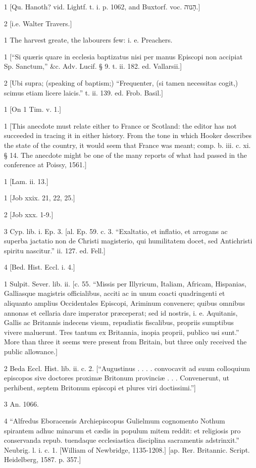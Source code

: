 1
[Qu. Hanoth? vid. Lightf. t. i. p. 1062, and Buxtorf. voc. הָנוה.]

2
[i.e. Walter Travers.]

1
The harvest greate, the labourers few: i. e. Preachers.

1
[“Si quæris quare in ecclesia baptizatus nisi per manus Episcopi non accipiat Sp. Sanctum,” &c. Adv. Lucif. § 9. t. ii. 182. ed. Vallarsii.]

2
[Ubi supra; (speaking of baptism;) “Frequenter, (si tamen necessitas cogit,) scimus etiam licere laicis.” t. ii. 139. ed. Frob. Basil.]

1
[On 1 Tim. v. 1.]

1
[This anecdote must relate either to France or Scotland: the editor has not succeeded in tracing it in either history. From the tone in which Hooker describes the state of the country, it would seem that France was meant; comp. b. iii. c. xi. § 14. The anecdote might be one of the many reports of what had passed in the conference at Poissy, 1561.]

1
[Lam. ii. 13.]

1
[Job xxix. 21, 22, 25.]

2
[Job xxx. 1-9.]

3
Cyp. lib. i. Ep. 3. [al. Ep. 59. c. 3. “Exaltatio, et inflatio, et arrogans ac superba jactatio non de Christi magisterio, qui humilitatem docet, sed Antichristi spiritu nascitur.” ii. 127. ed. Fell.]

4
[Bed. Hist. Eccl. i. 4.]

1
Sulpit. Sever. lib. ii. [c. 55. “Missis per Illyricum, Italiam, Africam, Hispanias, Galliasque magistris officialibus, acciti ac in unum coacti quadringenti et aliquanto amplius Occidentales Episcopi, Ariminum convenere; quibus omnibus annonas et cellaria dare imperator præceperat; sed id nostris, i. e. Aquitanis, Gallis ac Britannis indecens visum, repudiatis fiscalibus, propriis sumptibus vivere maluerunt. Tres tantum ex Britannia, inopia proprii, publico usi sunt.” More than three it seems were present from Britain, but three only received the public allowance.]

2
Beda Eccl. Hist. lib. ii. c. 2. [“Augustinus . . . . convocavit ad suum colloquium episcopos sive doctores proximæ Britonum provinciæ . . . Convenerunt, ut perhibent, septem Britonum episcopi et plures viri doctissimi.”]

3
An. 1066.

4
“Alfredus Eboracensis Archiepiscopus Gulielmum cognomento Nothum spirantem adhuc minarum et cædis in populum mitem reddit: et religiosis pro conservanda repub. tuendaque ecclesiastica disciplina sacramentis adstrinxit.” Neubrig. l. i. c. 1. [William of Newbridge, 1135-1208.] [ap. Rer. Britannic. Script. Heidelberg, 1587. p. 357.]

